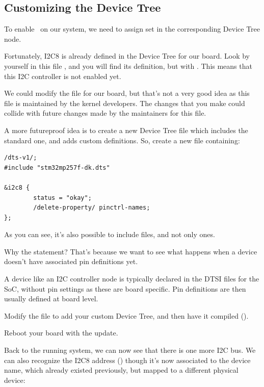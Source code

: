 {\subsection{Customizing the Device Tree}

To enable \busname\ on our system, we need to assign set  in the corresponding Device Tree node.

Fortunately, I2C8 is already defined in the Device Tree for our board.
Look by yourself in this file ,
and you will find its definition, but with .
This means that this I2C controller is not enabled yet.

We could modify the  file
for our board, but that's not a very good idea as this file is
maintained by the kernel developers. The changes that you make could
collide with future changes made by the maintainers for this file.

A more futureproof idea is to create a new Device Tree file which
includes the standard one, and adds custom definitions. So, create a
new  file containing:

\begin{verbatim}
/dts-v1/;
#include "stm32mp257f-dk.dts"

&i2c8 {
        status = "okay";
        /delete-property/ pinctrl-names;
};
\end{verbatim}

As you can see, it's also possible to include  files, and not
only  ones.

Why the  statement? That's because we want
to see what happens when a device doesn't have associated pin
definitions yet.

A device like an I2C controller node is typically declared in the DTSI
files for the SoC, without pin settings as these are board
specific. Pin definitions are then usually defined at board level.

Modify the  file to add your custom
Device Tree, and then have it compiled ().

Reboot your board with the update.

Back to the running system, we can now see that there is one more
I2C bus. We can also recognize the I2C8 address ()
though it's now associated to the  device name, which
already existed previously, but mapped to a different physical device:

}

